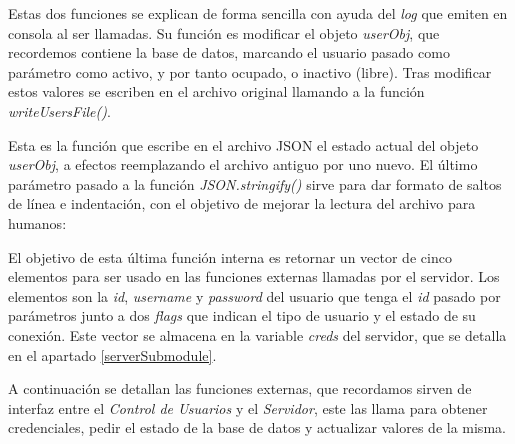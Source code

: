 Estas dos funciones se explican de forma sencilla con ayuda del \emph{log} que emiten en consola al ser llamadas. Su función es modificar el objeto \emph{userObj}, que recordemos contiene la base de datos, marcando el usuario pasado como parámetro como activo, y por tanto ocupado, o inactivo (libre). Tras modificar estos valores se escriben en el archivo original llamando a la función \emph{writeUsersFile()}.


Esta es la función que escribe en el archivo JSON el estado actual del objeto \emph{userObj}, a efectos reemplazando el archivo antiguo por uno nuevo. El último parámetro pasado a la función \emph{JSON.stringify()} sirve para dar formato de saltos de línea e indentación, con el objetivo de mejorar la lectura del archivo para humanos:

\begin{listing}[H]
\begin{minted}
[
frame=lines,
framesep=2mm,
baselinestretch=1.2,
bgcolor=lightgray,
fontsize=\footnotesize,
breaklines=true,
breaksymbolleft={}
]
{javascript}
function prepareToConnect(userId) {
   return [userObj.users[userId].id, userObj.users[userId].username, userObj.users[userId].password, false, 0];
\end{verbatim}
\caption{Preparación de credenciales}
\end{listing}

El objetivo de esta última función interna es retornar un vector de cinco elementos para ser usado en las funciones externas llamadas por el servidor. Los elementos son la \emph{id}, \emph{username} y \emph{password} del usuario que tenga el \emph{id} pasado por parámetros junto a dos \emph{flags} que indican el tipo de usuario y el estado de su conexión. Este vector se almacena en la variable \emph{creds} del servidor, que se detalla en el apartado \ref{serverSubmodule}.

A continuación se detallan las funciones externas, que recordamos sirven de interfaz entre el \emph{Control de Usuarios} y el \emph{Servidor}, este las llama para obtener credenciales, pedir el estado de la base de datos y actualizar valores de la misma.

